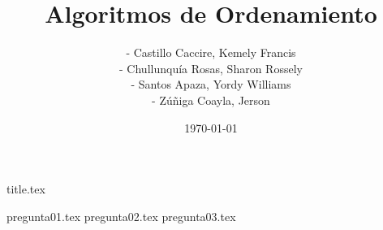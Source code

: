 \documentclass[a4paper,12pt]{article}
\title{Algoritmos de Ordenamiento}
\author{- Castillo Caccire, Kemely Francis\\
        - Chullunquía Rosas, Sharon Rossely\\
        - Santos Apaza, Yordy Williams\\
        - Zúñiga Coayla, Jerson}
\date{\today}
\begin{document}
{title.tex}

{pregunta01.tex}
{pregunta02.tex}
{pregunta03.tex}

\printbibliography[heading=bibintoc]
\end{document}
